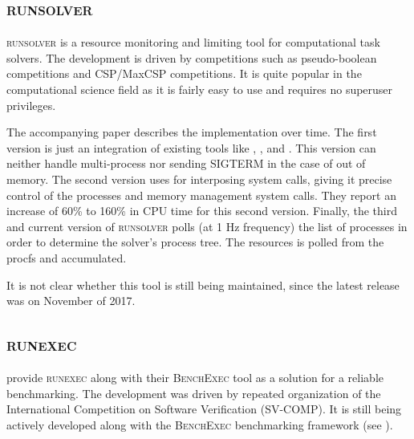 

\subsection{\textsc{runsolver}}
\label{sec:resource.impl.runsolver}

\textsc{runsolver} \citep{rousselControllingSolverExecution2011} is a resource monitoring and limiting tool for computational task solvers.
The development is driven by competitions such as pseudo-boolean competitions and CSP/MaxCSP competitions.
It is quite popular in the computational science field as it is fairly easy to use and requires no superuser privileges.

The accompanying paper describes the implementation over time.
The first version is just an integration of existing tools like , , and .
This version can neither handle multi-process nor sending SIGTERM in the case of out of memory.
The second version uses  for interposing system calls, giving it precise control of the processes and memory management system calls.
They report an increase of 60\% to 160\% in CPU time for this second version.
Finally, the third and current version of \textsc{runsolver} polls (at 1 Hz frequency) the list of processes in order to determine the solver's process tree.
The resources is polled from the procfs and accumulated.

It is not clear whether this tool is still being maintained, since the latest release was on November of 2017.


\subsection{\textsc{runexec}}

\citet{beyerReliableBenchmarkingRequirements2019} provide \textsc{runexec} along with their \textsc{BenchExec} tool as a solution for a reliable benchmarking.
The development was driven by repeated organization of the International Competition on Software Verification (SV-COMP).
It is still being actively developed along with the \textsc{BenchExec} benchmarking framework (see ).

